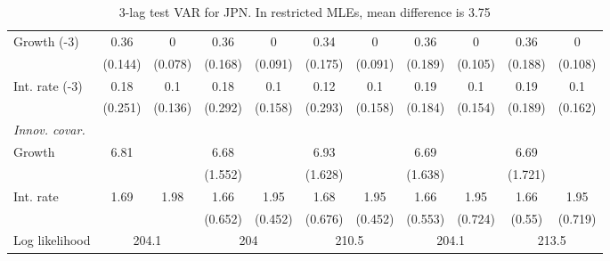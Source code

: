 \begin{table}[htbp]
\begin{tabular}{@{\extracolsep{4pt}}lcccccccccc@{}}
\quad Growth (-3) 	 &0.36 	 & 0 	 & 0.36 	 & 0 	 & 0.34 	 & 0 	 & 0.36 	 & 0 	 & 0.36 	 & 0	 \\ 
 		 & (0.144) 	 & (0.078) 	 & (0.168) 	 & (0.091) 	 & (0.175) 	 & (0.091) 	 & (0.189) 	 & (0.105) 	 & (0.188) 	 & (0.108) 	 \\ 
\quad Int. rate (-3) 	 &0.18 	 & 0.1 	 & 0.18 	 & 0.1 	 & 0.12 	 & 0.1 	 & 0.19 	 & 0.1 	 & 0.19 	 & 0.1	 \\ 
 		 & (0.251) 	 & (0.136) 	 & (0.292) 	 & (0.158) 	 & (0.293) 	 & (0.158) 	 & (0.184) 	 & (0.154) 	 & (0.189) 	 & (0.162) 	 \\ 
\rule{0pt}{4ex} \emph{Innov. covar.}  	 & 	 & 	 & 	 & 	 & 	 & 	 & 	 & 	 & 	 &\\ 
\quad Growth 	 &6.81 	 &  	 & 6.68 	 &  	 & 6.93 	 &  	 & 6.69 	 &  	 & 6.69 	 & 	 \\ 
 		 &  	 &  	 & (1.552) 	 &  	 & (1.628) 	 &  	 & (1.638) 	 &  	 & (1.721) 	 &  	 \\ 
\quad Int. rate 	 &1.69 	 & 1.98 	 & 1.66 	 & 1.95 	 & 1.68 	 & 1.95 	 & 1.66 	 & 1.95 	 & 1.66 	 & 1.95	 \\ 
 		 &  	 &  	 & (0.652) 	 & (0.452) 	 & (0.676) 	 & (0.452) 	 & (0.553) 	 & (0.724) 	 & (0.55) 	 & (0.719) 	 \\ 
 \hline \rule{0pt}{4ex} 
  Log likelihood 	 &\multicolumn{2}{c}{204.1} 	 & \multicolumn{2}{c}{204} 	 & \multicolumn{2}{c}{210.5} 	 & \multicolumn{2}{c}{204.1} 	 & \multicolumn{2}{c}{213.5}\\ 

 \hline 	\end{tabular}		\caption{3-lag test VAR for JPN. In restricted MLEs, mean difference is 3.75}
		\label{tab:JPN3lag}

\end{table}